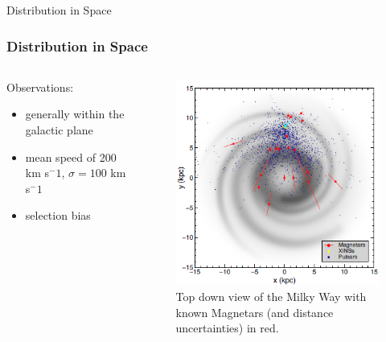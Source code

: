 \documentclass[hyperref=pdftex, presentation]{beamer}
\begin{document}
\begin{frame}{\Large Distribution in Space}
\frametitle{\Large Distribution in Space}

	\begin{minipage}[0.2\textheight]{\textwidth}
		\begin{columns}[T]
			\begin{column}{0.5\textwidth}
			
				\begin{block}{Observations:}
				
					\begin{itemize}
						 \item<2-> generally within the galactic plane %
						 \item<3-> mean speed of 200 km s$^-1$, $\sigma = 100$ km s$^-1$
						 \item<4-> selection bias
					\end{itemize}
				\end{block}
			\end{column}
			\begin{column}{0.5\textwidth}
				\begin{figure}
					\includegraphics[scale=.5]{figures/spatial.png}
					\caption{Top down view of the Milky Way with known Magnetars (and distance uncertainties) in red.}
				\end{figure}
			\end{column}
		\end{columns}
	\end{minipage}

\end{frame}
\end{document}
